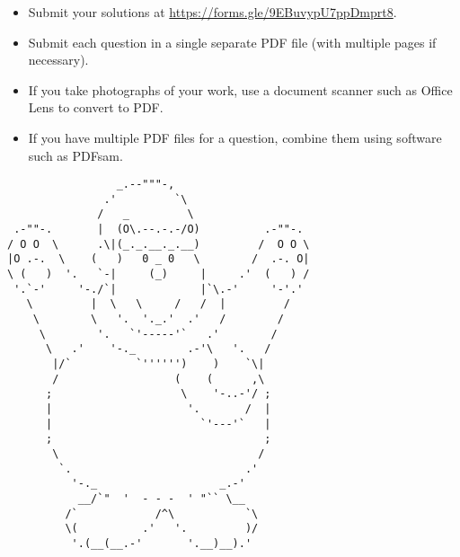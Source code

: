 \documentclass{article}
\begin{document}
\vfill
\small
\begin{itemize}
	\item Submit your solutions at \href{https://forms.gle/9EBuvypU7ppDmprt8}{https://forms.gle/9EBuvypU7ppDmprt8}.
	\item Submit each question in a single separate PDF file (with multiple pages if necessary).
	\item If you take photographs of your work, use a document scanner such as Office Lens to convert to PDF.
	\item If you have multiple PDF files for a question, combine them using software such as PDFsam.
\end{itemize}


\vfill
\centering
\scriptsize
\begin{BVerbatim}
                 _.--"""-,
               .'         `\
              /   _         \
 .-""-.       |  (O\.--.-.-/O)          .-""-.
/ O O  \      .\|(_._.__._.__)         /  O O \
|O .-.  \    (   )   0 _ 0   \        /  .-. O|
\ (   )  '.   `-|     (_)     |     .'  (   ) /
 '.`-'     '-./`|             |`\.-'     '-'.'
   \         |  \   \     /   /  |         /
    \        \   '.  '._.'  .'   /        /
     \        '.   `'-----'`   .'        /
      \   .'    '-._        .-'\   '.   /
       |/`          `'''''')    )    `\|
       /                  (    (      ,\
      ;                    \    '-..-'/ ;
      |                     '.       /  |
      |                       `'---'`   |
      ;                                 ;
       \                               /
        `.                           .'
          '-._                   _.-'
           __/`"  '  - - -  ' "`` \__
         /`            /^\           `\
         \(          .'   '.         )/
          '.(__(__.-'       '.__)__).'
\end{BVerbatim}
\end{document}
